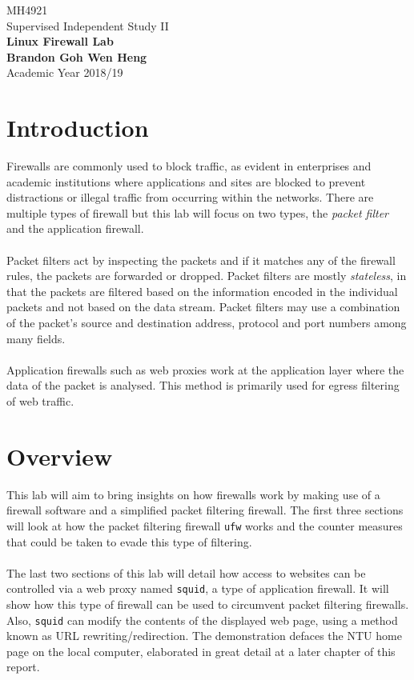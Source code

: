 \documentclass[a4paper,12pt]{article}
\begin{document}
	\begin{titlepage}
		\begin{center}
			\vspace*{9em}
			\Huge 
			MH4921\\ Supervised Independent Study II\\
			\vspace*{4em}
			\LARGE
			\textbf{Linux Firewall Lab}\\		
			\vspace{4em}
			\textbf{Brandon Goh Wen Heng}\\
			\vspace*{4em}
			Academic Year 2018/19
			\vfill
		\end{center}
	\end{titlepage}
	
	\tableofcontents
	\newpage
	\section{Introduction}
	Firewalls are commonly used to block traffic, as evident in enterprises and academic institutions where applications and sites are blocked to prevent distractions or illegal traffic from occurring within the networks. There are multiple types of firewall but this lab will focus on two types, the \textit{packet filter} and the application firewall.\\\\Packet filters act by inspecting the packets and if it matches any of the firewall rules, the packets are forwarded or dropped. Packet filters are mostly \textit{stateless}, in that the packets are filtered based on the information encoded in the individual packets and not based on the data stream. Packet filters may use a combination of the packet's source and destination address, protocol and port numbers among many fields.\\\\Application firewalls such as web proxies work at the application layer where the data of the packet is analysed. This method is primarily used for egress filtering of web traffic.
\section{Overview}
This lab will aim to bring insights on how firewalls work by making use of a firewall software and a simplified packet filtering firewall. The first three sections will look at how the packet filtering firewall \texttt{ufw} works and the counter measures that could be taken to evade this type of filtering.\\\\The last two sections of this lab will detail how access to websites can be controlled via a web proxy named \texttt{squid}, a type of application firewall. It will show how this type of firewall can be used to circumvent packet filtering firewalls. Also, \texttt{squid} can modify the contents of the displayed web page, using a method known as URL rewriting/redirection. The demonstration defaces the NTU home page on the local computer, elaborated in great detail at a later chapter of this report. 
\end{document}
